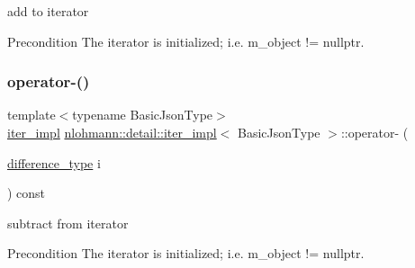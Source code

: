 add to iterator 

\begin{DoxyPrecond}{Precondition}
The iterator is initialized; i.\+e. {\ttfamily m\+\_\+object != nullptr}. 
\end{DoxyPrecond}
\mbox{\label{classnlohmann_1_1detail_1_1iter__impl_a0dd9c415b94a02ff2aa25da75e52da30}} 
\subsubsection{\texorpdfstring{operator-\/()}{operator-()}\hspace{0.1cm}{\footnotesize\ttfamily [1/2]}}
{\footnotesize\ttfamily template$<$typename Basic\+Json\+Type$>$ \\
\hyperlink{classnlohmann_1_1detail_1_1iter__impl}{iter\+\_\+impl} \hyperlink{classnlohmann_1_1detail_1_1iter__impl}{nlohmann\+::detail\+::iter\+\_\+impl}$<$ Basic\+Json\+Type $>$\+::operator-\/ (\begin{DoxyParamCaption}\item[{\hyperlink{classnlohmann_1_1detail_1_1iter__impl_a2f7ea9f7022850809c60fc3263775840}{difference\+\_\+type}}]{i }\end{DoxyParamCaption}) const\hspace{0.3cm}{\ttfamily [inline]}}



subtract from iterator 

\begin{DoxyPrecond}{Precondition}
The iterator is initialized; i.\+e. {\ttfamily m\+\_\+object != nullptr}. 
\end{DoxyPrecond}
\mbox{\label{classnlohmann_1_1detail_1_1iter__impl_a49bf3e708a9c1c88c415011735962d06}} 
